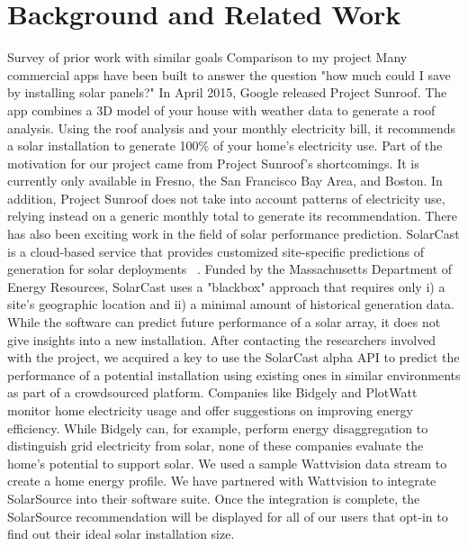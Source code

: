 \documentclass[pageno]{jpaper}
\begin{document}
\section{Background and Related Work}
Survey of prior work with similar goals
Comparison to my project
\indent Many commercial apps have been built to answer the question "how much could I save by installing solar panels?" In April 2015, Google released Project Sunroof. The app combines a 3D model of your house with weather data to generate a roof analysis. Using the roof analysis and your monthly electricity bill, it recommends a solar installation to generate 100\% of your home's electricity use. Part of the motivation for our project came from Project Sunroof's shortcomings. It is currently only available in Fresno, the San Francisco Bay Area, and Boston. In addition, Project Sunroof does not take into account patterns of electricity use, relying instead on a generic monthly total to generate its recommendation. \newline
\newline
\indent There has also been exciting work in the field of solar performance prediction. SolarCast is a cloud-based service that provides customized site-specific predictions of generation for solar deployments ~\cite{Iyengar:2014:SCB:2674061.2674071}. Funded by the Massachusetts Department of Energy Resources, SolarCast uses a "blackbox" approach that requires only i) a site's geographic location and ii) a minimal amount of historical generation data. While the software can predict future performance of a solar array, it does not give insights into a new installation. After contacting the researchers involved with the project, we acquired a key to use the SolarCast alpha API to predict the performance of a potential installation using existing ones in similar environments as part of a crowdsourced platform. \newline
\newline
\indent Companies like Bidgely and PlotWatt monitor home electricity usage and offer suggestions on improving energy efficiency. While Bidgely can, for example, perform energy disaggregation to distinguish grid electricity from solar, none of these companies evaluate the home's potential to support solar. We used a sample Wattvision data stream to create a home energy profile. We have partnered with Wattvision to integrate SolarSource into their software suite. Once the integration is complete, the SolarSource recommendation will be displayed for all of our users that opt-in to find out their ideal solar installation size. \newline
\end{document}
